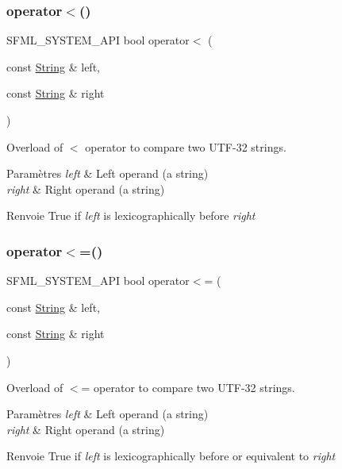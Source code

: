 \subsubsection{\texorpdfstring{operator$<$()}{operator<()}}
{\footnotesize\ttfamily S\+F\+M\+L\+\_\+\+S\+Y\+S\+T\+E\+M\+\_\+\+A\+PI bool operator$<$ (\begin{DoxyParamCaption}\item[{const \hyperlink{classsf_1_1String}{String} \&}]{left,  }\item[{const \hyperlink{classsf_1_1String}{String} \&}]{right }\end{DoxyParamCaption})\hspace{0.3cm}{\ttfamily [related]}}



Overload of $<$ operator to compare two U\+T\+F-\/32 strings. 


\begin{DoxyParams}{Paramètres}
{\em left} & Left operand (a string) \\
\hline
{\em right} & Right operand (a string)\\
\hline
\end{DoxyParams}
\begin{DoxyReturn}{Renvoie}
True if {\itshape left} is lexicographically before {\itshape right} 
\end{DoxyReturn}
\mbox{\label{classsf_1_1String_abd342b6094b81cd086c7929b53b112ae}} 
\subsubsection{\texorpdfstring{operator$<$=()}{operator<=()}}
{\footnotesize\ttfamily S\+F\+M\+L\+\_\+\+S\+Y\+S\+T\+E\+M\+\_\+\+A\+PI bool operator$<$= (\begin{DoxyParamCaption}\item[{const \hyperlink{classsf_1_1String}{String} \&}]{left,  }\item[{const \hyperlink{classsf_1_1String}{String} \&}]{right }\end{DoxyParamCaption})\hspace{0.3cm}{\ttfamily [related]}}



Overload of $<$= operator to compare two U\+T\+F-\/32 strings. 


\begin{DoxyParams}{Paramètres}
{\em left} & Left operand (a string) \\
\hline
{\em right} & Right operand (a string)\\
\hline
\end{DoxyParams}
\begin{DoxyReturn}{Renvoie}
True if {\itshape left} is lexicographically before or equivalent to {\itshape right} 
\end{DoxyReturn}
\mbox{\label{classsf_1_1String_a2a385459fa9a237e61a712fa956d489e}} 
